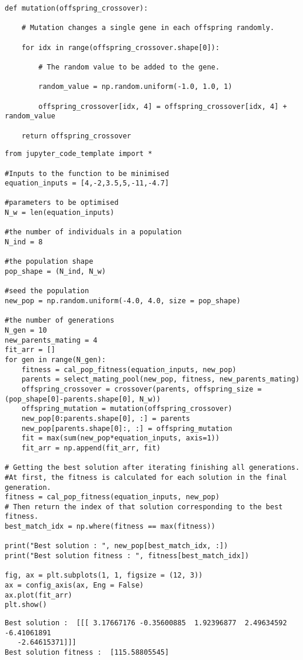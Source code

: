 \documentclass[11pt]{article}
\begin{document}
\begin{lstlisting}
def mutation(offspring_crossover):

    # Mutation changes a single gene in each offspring randomly.

    for idx in range(offspring_crossover.shape[0]):

        # The random value to be added to the gene.

        random_value = np.random.uniform(-1.0, 1.0, 1)

        offspring_crossover[idx, 4] = offspring_crossover[idx, 4] + random_value

    return offspring_crossover
\end{lstlisting}%
\begin{lstlisting}
from jupyter_code_template import *

#Inputs to the function to be minimised
equation_inputs = [4,-2,3.5,5,-11,-4.7]

#parameters to be optimised
N_w = len(equation_inputs)

#the number of individuals in a population
N_ind = 8

#the population shape
pop_shape = (N_ind, N_w)

#seed the population
new_pop = np.random.uniform(-4.0, 4.0, size = pop_shape)

#the number of generations
N_gen = 10
new_parents_mating = 4
fit_arr = []
for gen in range(N_gen):
    fitness = cal_pop_fitness(equation_inputs, new_pop)
    parents = select_mating_pool(new_pop, fitness, new_parents_mating)
    offspring_crossover = crossover(parents, offspring_size = (pop_shape[0]-parents.shape[0], N_w))
    offspring_mutation = mutation(offspring_crossover)
    new_pop[0:parents.shape[0], :] = parents
    new_pop[parents.shape[0]:, :] = offspring_mutation
    fit = max(sum(new_pop*equation_inputs, axis=1))
    fit_arr = np.append(fit_arr, fit)

# Getting the best solution after iterating finishing all generations.
#At first, the fitness is calculated for each solution in the final generation.
fitness = cal_pop_fitness(equation_inputs, new_pop)
# Then return the index of that solution corresponding to the best fitness.
best_match_idx = np.where(fitness == max(fitness))

print("Best solution : ", new_pop[best_match_idx, :])
print("Best solution fitness : ", fitness[best_match_idx])

fig, ax = plt.subplots(1, 1, figsize = (12, 3))
ax = config_axis(ax, Eng = False)
ax.plot(fit_arr)
plt.show()
\end{lstlisting}%
    \begin{Verbatim}[commandchars=\\\{\}]
Best solution :  [[[ 3.17667176 -0.35600885  1.92396877  2.49634592 -6.41061891
   -2.64615371]]]
Best solution fitness :  [115.58805545]

    \end{Verbatim}
\end{document}

